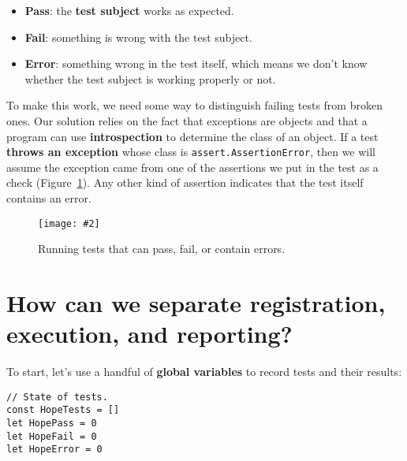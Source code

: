 \documentclass[krantzl]{krantz}
\newcommand{\figpdf}[4]{\begin{figure}%
\centering%
\texttt{[image: \#2]}%
\caption{#3}%
\label{#1}%
\end{figure}}
\newcommand{\figref}[1]{Figure~\ref{#1}}
\newcommand{\glossref}[1]{\textbf{#1}}
\begin{document}
\begin{itemize}

\item 

\glossref{Pass}:
    the \glossref{test subject} works as expected.



\item 

\glossref{Fail}:
    something is wrong with the test subject.



\item 

\glossref{Error}:
    something wrong in the test itself,
    which means we don't know whether the test subject is working properly or not.



\end{itemize}


To make this work,
we need some way to distinguish failing tests from broken ones.
Our solution relies on the fact that exceptions are objects
and that a program can use \glossref{introspection}
to determine the class of an object.
If a test \glossref{throws an exception} whose class is \texttt{assert.AssertionError},
then we will assume the exception came from
one of the assertions we put in the test as a check
(\figref{unit-test-mental-model}).
Any other kind of assertion indicates that the test itself contains an error.

\figpdf{unit-test-mental-model}{./unit-test/mental-model.pdf}{Running tests that can pass, fail, or contain errors.}{0.6}

\section{How can we separate registration, execution, and reporting?}\label{unit-test-design}


To start,
let's use a handful of \glossref{global variables} to record tests and their results:


\begin{lstlisting}[frame=single,frameround=tttt]
// State of tests.
const HopeTests = []
let HopePass = 0
let HopeFail = 0
let HopeError = 0
\end{lstlisting}
\end{document}
